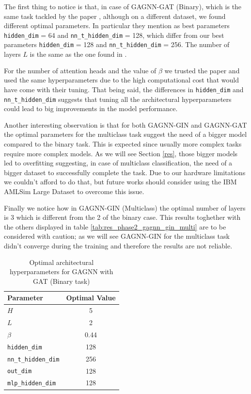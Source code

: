 The first thing to notice is that, in case of GAGNN-GAT (Binary), which is the same task tackled by the paper \cite{mainpaper}, although on a different dataset, we found different optimal parameters. In particular they mention as best parameters \texttt{hidden\_dim} = 64 and \texttt{nn\_t\_hidden\_dim} = 128, which differ from our best parameters \texttt{hidden\_dim} = 128 and \texttt{nn\_t\_hidden\_dim} = 256.
The number of layers $L$ is the same as the one found in \cite{mainpaper}.

For the number of attention heads and the value of \(\beta\) we trusted the paper and used the same hyperparameters due to the high computational cost that would have come with their tuning. That being said, the differences in \texttt{hidden\_dim} and \texttt{nn\_t\_hidden\_dim} suggests that tuning all the architectural hyperparameters could lead to big improvements in the model performance.

Another interesting observation is that for both GAGNN-GIN and GAGNN-GAT the optimal parameters for the multiclass task suggest the need of a bigger model compared to the binary task. This is expected since usually more complex tasks require more complex models. 
As we will see Section \ref{res}, those bigger models led to overfitting suggesting, in case of multiclass classification, the need of a bigger dataset to successfully complete the task. Due to our hardware limitations we couldn't afford to do that, but future works should consider using the IBM AMLSim Large Dataset to overcome this issue.

Finally we notice how in GAGNN-GIN (Multiclass) the optimal number of layers is 3 which is different from the 2 of the binary case. This results toghether with the others displayed in table \ref{tab:res_phase2_gagnn_gin_multi} are to be considered with caution; as we will see GAGNN-GIN for the multiclass task didn't converge during the training and therefore the results are not reliable.
\begin{table}
\centering
\begin{tabular}{l c}
\hline
\textbf{Parameter} & \textbf{Optimal Value} \\
\hline
$H$ & 5  \\
$L$ &  2 \\
$\beta$ & 0.44  \\
\texttt{hidden\_dim} & 128 \\
\texttt{nn\_t\_hidden\_dim} & 256 \\
\texttt{out\_dim} & 128 \\
\texttt{mlp\_hidden\_dim} & 128  \\
\hline
\end{tabular}
\caption{Optimal architectural hyperparameters for GAGNN with GAT (Binary task)}
\label{tab:res_phase2_gagnn_gat_bin}
\end{table}

